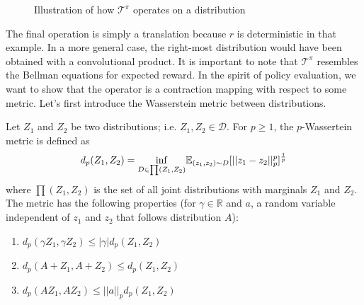 \documentclass{article}
\begin{document}
\begin{figure}[H]
\centering
{}
\caption{Illustration of how $\mathcal{T}^\pi$ operates on a distribution}
\end{figure}
The final operation is simply a translation because $r$ is deterministic in that example. In a more general case, the right-most distribution would have been obtained with a convolutional product.
It is important to note that $\mathcal{T}^\pi$ resembles the Bellman equations for expected reward. 
In the spirit of policy evaluation, we want to show that the operator is a contraction mapping with respect to some metric. 
Let's first introduce the Wasserstein metric between distributions.



\begin{defn}
\label{def:wass}
Let $Z_1$ and $Z_2$ be two distributions; i.e. $Z_1,Z_2\in\mathcal{D}$. For $p\geq1$, the $p$-Wassertein metric is defined as
\begin{equation}
    d_p(Z_1,Z_2)=\underset{D \in  \prod (Z_1, Z_2) }{\inf}\mathbb{E}_{(z_1,z_2)\sim D}[||z_1 - z_2||_p^p]^{\frac{1}{p}}
\end{equation} 
where $\prod (Z_1, Z_2)$ is the set of all joint distributions with marginals $Z_1$ and $Z_2$. The metric has the following properties (for $\gamma \in \mathbb{R}$ and $a$, a random variable independent of $z_1$ and $z_2$ that follows distribution $A$):
\begin{enumerate}
    \item $d_p(\gamma Z_1, \gamma Z_2) \leq |\gamma| d_p(Z_1, Z_2)$
    \item $d_p(A+Z_1, A+Z_2) \leq d_p(Z_1, Z_2)$
    \item $d_p(A Z_1, A Z_2) \leq ||a||_p d_p(Z_1, Z_2)$
\end{enumerate}
\end{defn}
\end{document}
